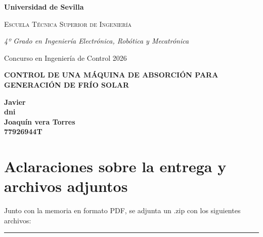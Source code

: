 \documentclass[12pt,a4paper]{article}
\begin{document}
	
	\begin{titlepage}
		\centering
		\vspace*{1cm}
		{\bfseries\LARGE Universidad de Sevilla \par}
		\vspace{0.5cm}
		{\scshape\Large Escuela Técnica Superior de Ingeniería \par}
		\vspace{2cm}
		{\itshape\Large 4º Grado en Ingeniería Electrónica, Robótica y Mecatrónica \par}
		\vspace{1cm}
		{\Large Concurso en
			Ingeniería de Control
			2026 \par}
		\vfill
		{\huge\bfseries CONTROL DE UNA MÁQUINA DE
			ABSORCIÓN PARA GENERACIÓN DE
			FRÍO SOLAR
			 \par}
		\vspace{0.5cm}
		\vfill
		
		\begin{flushright}
			\large
			\textbf{Javier  } \\
			\textbf{dni} \\
			\textbf{Joaquín vera Torres} \\
			\textbf{77926944T} \\
			\vspace{0.5cm}
		\end{flushright}
	\end{titlepage}
	
	\newpage
	\section*{Aclaraciones sobre la entrega y archivos adjuntos}
	
	Junto con la  memoria en formato PDF, se adjunta un .zip con los siguientes archivos: 
	
	
	
	\vspace{0.5cm}
	\hrule
	\vspace{0.5cm}
	
	\newpage
	
	\tableofcontents
	\newpage
	
	
	
	
\end{document}
